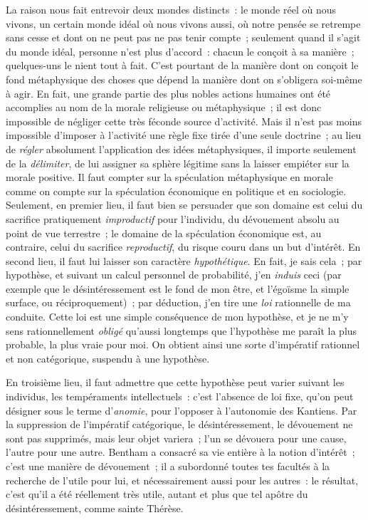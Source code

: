 \documentclass[french,twoside]{book} %
\begin{document}
La raison nous fait entrevoir deux mondes distincts : le monde réel où nous vivons, un certain monde idéal où nous vivons aussi, où notre pensée se retrempe sans cesse et dont on ne peut pas ne pas tenir compte ; seulement quand il s’agit du monde idéal, personne n’est plus d’accord : chacun le conçoit à sa manière ; quelques-uns le nient tout à fait. C’est pourtant de la manière dont on conçoit le fond métaphysique des choses que dépend la manière dont on s’obligera soi-même à agir. En fait, une grande partie des plus nobles actions humaines ont été accomplies au nom de la morale religieuse ou métaphysique ; il est donc impossible de négliger cette très féconde source d’activité. Mais il n’est pas moins impossible d’imposer à l’activité une règle fixe tirée d’une seule doctrine ; au lieu de \emph{régler} absolument l’application des idées métaphysiques, il importe seulement de la \emph{délimiter}, de lui assigner sa sphère légitime sans la laisser empiéter sur la morale positive. Il faut compter sur la spéculation métaphysique en morale comme on compte sur la spéculation économique en politique et en sociologie. Seulement, en premier lieu, il faut bien se persuader que son domaine est celui du sacrifice pratiquement \emph{improductif} pour l’individu, du dévouement absolu au point de vue terrestre ; le domaine de la spéculation économique est, au contraire, celui du sacrifice \emph{reproductif}, du risque couru dans un but d’intérêt. En second lieu, il faut lui laisser son caractère \emph{hypothétique}. En fait, je sais cela ; par hypothèse, et suivant un calcul personnel de probabilité, j’en \emph{induis} ceci (par exemple que le désintéressement est le fond de mon être, et l’égoïsme la simple surface, ou réciproquement) ; par déduction, j’en tire une \emph{loi} rationnelle de ma conduite. Cette loi est une simple conséquence de mon hypothèse, et je ne m’y sens rationnellement \emph{obligé} qu’aussi longtemps que l’hypothèse me paraît la plus probable, la plus vraie pour moi. On obtient ainsi une sorte d’impératif rationnel et non catégorique, suspendu à une hypothèse.\par
En troisième lieu, il faut admettre que cette hypothèse peut varier suivant les individus, les tempéraments intellectuels : c’est l’absence de loi fixe, qu’on peut désigner sous le terme d’\emph{anomie}, pour l’opposer à l’autonomie des Kantiens. Par la suppression de l’impératif catégorique, le désintéressement, le dévouement ne sont pas supprimés, mais leur objet variera ; l’un se dévouera pour une cause, l’autre pour une autre. Bentham a consacré sa vie entière à la notion d’intérêt ; c’est une manière de dévouement ; il a subordonné toutes tes facultés à la recherche de l’utile pour lui, et nécessairement aussi pour les autres : le résultat, c’est qu’il a été réellement très utile, autant et plus que tel apôtre du désintéressement, comme sainte Thérèse.\par
\end{document}
